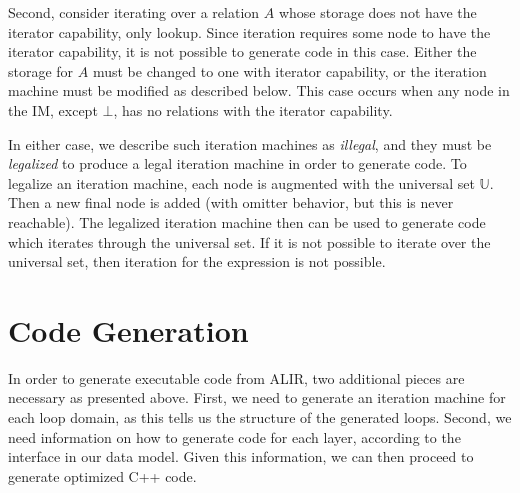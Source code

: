 \documentclass[acmsmall,screen,nonacm]{acmart}\settopmatter{printfolios=true,printccs=false,printacmref=false}
\begin{document}
Second, consider iterating over a relation $A$ whose storage does not have the iterator capability, only lookup. Since iteration requires some node to have the iterator capability, it is not possible to generate code in this case. Either the storage for $A$ must be changed to one with iterator capability, or the iteration machine must be modified as described below. This case occurs when any node in the IM, except $\bot$, has no relations with the iterator capability.

In either case, we describe such iteration machines as \emph{illegal}, and they must be \emph{legalized} to produce a legal iteration machine in order to generate code. To legalize an iteration machine, each node is augmented with the universal set $\mathbb{U}$. Then a new final node is added (with omitter behavior, but this is never reachable). The legalized iteration machine then can be used to generate code which iterates through the universal set. If it is not possible to iterate over the universal set, then iteration for the expression is not possible.

\section{Code Generation}
\label{sec:code-generation}

In order to generate executable code from ALIR, two additional pieces are necessary as presented above.
First, we need to generate an iteration machine for each loop domain, as this tells us the structure of the generated loops. Second, we need information on how to generate code for each layer, according to the interface in our data model. Given this information, we can then proceed to generate optimized C++ code.
\end{document}
